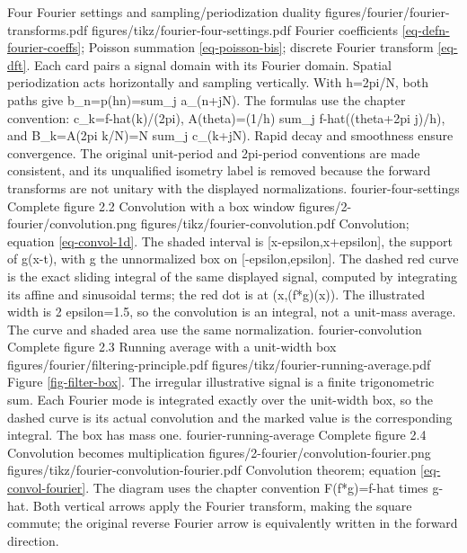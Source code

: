 {Four Fourier settings and sampling/periodization duality}
{figures/fourier/fourier-transforms.pdf}
{figures/tikz/fourier-four-settings.pdf}
{Fourier coefficients \eqref{eq-defn-fourier-coeffs}; Poisson summation \eqref{eq-poisson-bis}; discrete Fourier transform \eqref{eq-dft}.}
{Each card pairs a signal domain with its Fourier domain. Spatial periodization acts horizontally and sampling vertically. With h=2pi/N, both paths give b\_n=p(hn)=sum\_j a\_(n+jN). The formulas use the chapter convention: c\_k=f-hat(k)/(2pi), A(theta)=(1/h) sum\_j f-hat((theta+2pi j)/h), and B\_k=A(2pi k/N)=N sum\_j c\_(k+jN). Rapid decay and smoothness ensure convergence. The original unit-period and 2pi-period conventions are made consistent, and its unqualified isometry label is removed because the forward transforms are not unitary with the displayed normalizations.}
{fourier-four-settings}
{Complete figure}
{2.2}
{Convolution with a box window}
{figures/2-fourier/convolution.png}
{figures/tikz/fourier-convolution.pdf}
{Convolution; equation \eqref{eq-convol-1d}.}
{The shaded interval is [x-epsilon,x+epsilon], the support of g(x-t), with g the unnormalized box on [-epsilon,epsilon]. The dashed red curve is the exact sliding integral of the same displayed signal, computed by integrating its affine and sinusoidal terms; the red dot is at (x,(f*g)(x)). The illustrated width is 2 epsilon=1.5, so the convolution is an integral, not a unit-mass average. The curve and shaded area use the same normalization.}
{fourier-convolution}
{Complete figure}
{2.3}
{Running average with a unit-width box}
{figures/fourier/filtering-principle.pdf}
{figures/tikz/fourier-running-average.pdf}
{Figure \ref{fig-filter-box}.}
{The irregular illustrative signal is a finite trigonometric sum. Each Fourier mode is integrated exactly over the unit-width box, so the dashed curve is its actual convolution and the marked value is the corresponding integral. The box has mass one.}
{fourier-running-average}
{Complete figure}
{2.4}
{Convolution becomes multiplication}
{figures/2-fourier/convolution-fourier.png}
{figures/tikz/fourier-convolution-fourier.pdf}
{Convolution theorem; equation \eqref{eq-convol-fourier}.}
{The diagram uses the chapter convention F(f*g)=f-hat times g-hat. Both vertical arrows apply the Fourier transform, making the square commute; the original reverse Fourier arrow is equivalently written in the forward direction.}
